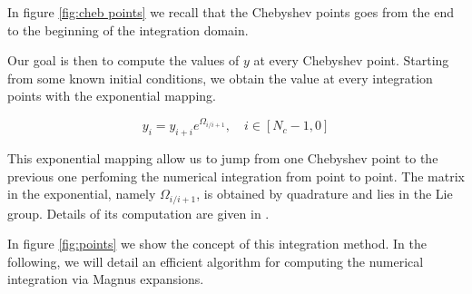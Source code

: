\documentclass[12pt,a4paper]{article}
\begin{document}
In figure \ref{fig:cheb points} we recall that the Chebyshev points goes from the end to the beginning of the integration domain. 

Our goal is then to compute the values of $y$ at every Chebyshev point. Starting from some known initial conditions, we obtain the value at every integration points with the exponential mapping.

\begin{equation}\label{eq:recursion}
	y_{i} = y_{i+i} e^{\Omega_{i/i+1}}, \quad i \in [N_c -1, 0]
\end{equation}

This exponential mapping allow us to jump from one Chebyshev point to the previous one perfoming the numerical integration from point to point. The matrix in the exponential, namely $\Omega_{i/i+1}$, is obtained by quadrature and lies in the Lie group. Details of its computation are given in \cite{blanes2009magnus}.

In figure \ref{fig:points} we show the concept of this integration method. In the following, we will detail an efficient algorithm for computing the numerical integration via Magnus expansions.
\end{document}
